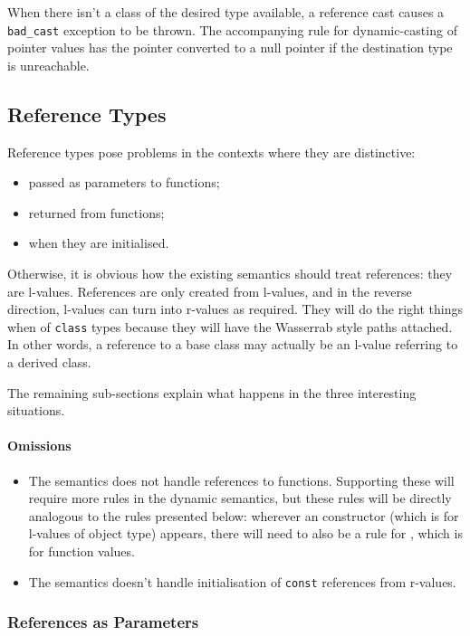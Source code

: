 \documentclass[11pt]{article}
\begin{document}
When there isn't a class of the desired type available, a reference
cast causes a \texttt{bad_cast} exception to be thrown.  The
accompanying rule for dynamic-casting of pointer values has the
pointer converted to a null pointer if the destination type is unreachable.


\subsection{Reference Types}
\label{sec:reftypes}

Reference types pose problems in the contexts where they are
distinctive:
\begin{itemize}
\item passed as parameters to functions;
\item returned from functions;
\item when they are initialised.
\end{itemize}

Otherwise, it is obvious how the existing semantics should treat
references: they are l-values.  References are only created from
l-values, and in the reverse direction, l-values can turn into
r-values as required.  They will do the right things when of
\texttt{class} types because they will have the Wasserrab style paths
attached.  In other words, a reference to a base class may actually be
an l-value referring to a derived class.

The remaining sub-sections explain what happens in the three
interesting situations.

\paragraph{Omissions}
\begin{itemize}
\item The semantics does not handle references to functions.
  Supporting these will require more rules in the dynamic semantics,
  but these rules will be directly analogous to the rules presented
  below: wherever an \clvalue{} constructor (which is for l-values of
  object type) appears, there will need to also be a rule for
  \cfvalue{}, which is for function values.
\item The semantics doesn't handle initialisation of \texttt{const}
  references from r-values.
\end{itemize}


\subsubsection{References as Parameters}
\end{document}
